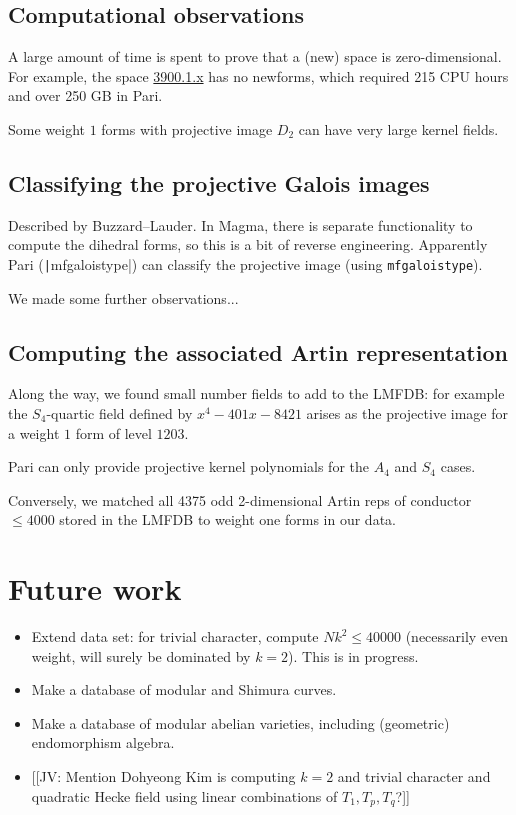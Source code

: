 \documentclass[11pt]{amsart}
\numberwithin{equation}{subsection}
\theoremstyle{plain}
\theoremstyle{definition}
\newcommand{\jv}[1]{{\color{red} \textsf{[[JV: #1]]}}}
\begin{document}
\subsection{Computational observations}

A large amount of time is spent to prove that a (new) space is zero-dimensional.  For example, the space \href{http://cmfs.lmfdb.xyz/ModularForm/GL2/Q/holomorphic/3900/1/x/}{3900.1.x} has no newforms, which required 215 CPU hours and over 250 GB in Pari.  

Some weight $1$ forms with projective image $D_2$ can have very large kernel fields.

\subsection{Classifying the projective Galois images}

Described by Buzzard--Lauder.  In Magma, there is separate functionality to compute the dihedral forms, so this is a bit of reverse engineering.  Apparently Pari (\texttt|mfgaloistype|) can classify the projective image (using \verb|mfgaloistype|).

We made some further observations...

\subsection{Computing the associated Artin representation}

Along the way, we found small number fields to add to the LMFDB: for example the $S_4$-quartic field defined by $x^4-401x-8421$ arises as the projective image for a weight $1$ form of level $1203$.

Pari can only provide projective kernel polynomials for the $A_4$ and $S_4$ cases.  

Conversely, we matched all 4375 odd 2-dimensional Artin reps of conductor $\leq 4000$ stored in the LMFDB to weight one forms in our data.

\section{Future work}

\begin{itemize}
\item Extend data set: for trivial character, compute $Nk^2 \leq 40000$ (necessarily even weight, will surely be dominated by $k=2$).  This is in progress.
\item Make a database of modular and Shimura curves.
\item Make a database of modular abelian varieties, including (geometric) endomorphism algebra.
\item \jv{Mention Dohyeong Kim is computing $k=2$ and trivial character and quadratic Hecke field using linear combinations of $T_1,T_p,T_q$?}
\end{itemize}
\end{document}
